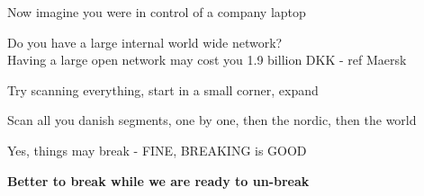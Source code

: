 \documentclass[Screen16to9,17pt,footrule]{foils}
\begin{document}
\begin{list2}
\item Now imagine you were in control of a company laptop
\item Do you have a large internal world wide network?\\
Having a large open network may cost you 1.9 billion DKK - ref Maersk
\item Try scanning everything, start in a small corner, expand
\item Scan all you danish segments, one by one, then the nordic, then the world
\item Yes, things may break - FINE, BREAKING is GOOD
\end{list2}

\centerline{\bf Better to break while we are ready to un-break}


\myquestionspage
\end{document}
